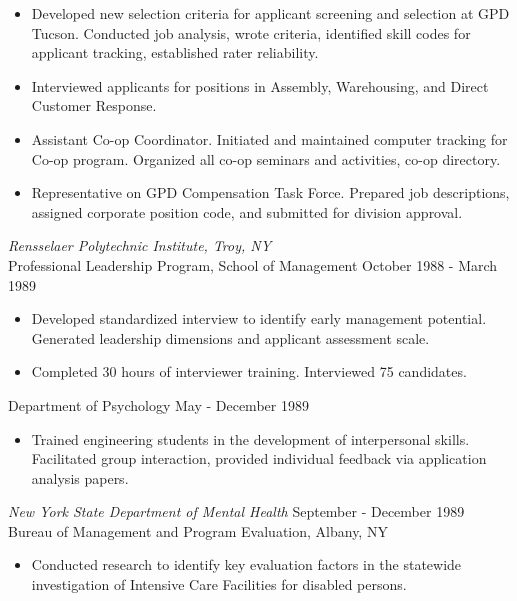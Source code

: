 \documentclass{res}
\begin{document}
\begin{resume}
   \begin{itemize} \itemsep -2pt %
   \item Developed  new selection criteria for applicant screening and 
    selection  at  GPD  Tucson.  Conducted  job  analysis,  wrote 
    criteria,  identified  skill  codes  for  applicant tracking, 
    established rater reliability. 
   \item Interviewed   applicants   for   positions    in    Assembly, 
    Warehousing, and Direct Customer Response. 
  \item Assistant   Co-op   Coordinator.   Initiated  and  maintained 
    computer tracking for  Co-op  program.  Organized  all  co-op 
    seminars and activities, co-op directory. 
   \item Representative  on  GPD Compensation Task Force. Prepared job 
    descriptions, assigned corporate position code, and submitted 
    for division approval. 
 \end{itemize}
{\sl Rensselaer Polytechnic Institute, Troy, NY} \\[2pt]
Professional Leadership Program, School of Management \hfill    October 
 1988 - March 1989 

 \begin{itemize} \itemsep -2pt
  \item  Developed standardized interview to identify early management 
    potential.  Generated  leadership  dimensions  and  applicant 
    assessment scale. 
  \item  Completed 30 hours of interviewer  training.  Interviewed  75 
 candidates. 
\end{itemize} \vspace{-6pt}
 
Department of Psychology       \hfill               May - December 1989 
 \begin{itemize} 
 \item  Trained  engineering   students   in   the   development   of 
    interpersonal skills. Facilitated group interaction, provided 
    individual feedback via application analysis papers. 
 \end{itemize}
 
{\sl New York State Department of Mental Health} \hfill  September - December 
1989 \\
Bureau of Management and Program Evaluation, Albany, NY 
  \begin{itemize}
  \item  Conducted  research to identify key evaluation factors in the 
    statewide investigation  of  Intensive  Care  Facilities  for 
    disabled persons. 
 \end{itemize}


\end{resume}
\end{document}
